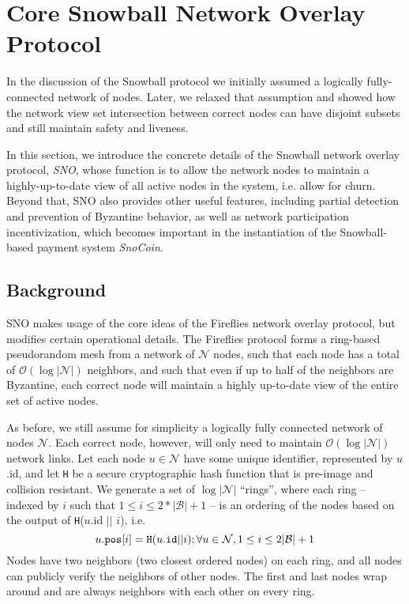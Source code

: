 \section{Core Snowball Network Overlay Protocol}
In the discussion of the Snowball protocol we initially assumed a logically fully-connected network of nodes. 
Later, we relaxed that assumption and showed how the network view set intersection between correct nodes can have disjoint subsets and still maintain safety and liveness. 

In this section, we introduce the concrete details of the Snowball network overlay protocol, \textit{SNO}, whose function is to allow the network nodes to maintain a highly-up-to-date view of all active nodes in the system, i.e. allow for churn.
Beyond that, SNO also provides other useful features, including partial detection and prevention of Byzantine behavior, as well as network participation incentivization, which becomes important in the instantiation of the Snowball-based payment system \textit{SnoCoin}. 

\subsection{Background}
SNO makes usage of the core ideas of the Fireflies\cite{johansen2006fireflies} network overlay protocol, but modifies certain operational details. 
The Fireflies protocol forms a ring-based pseudorandom mesh from a network of $\mathcal{N}$ nodes, such that each node has a total of $\mathcal{O}(\log{|\mathcal{N}|})$ neighbors, and such that even if up to half of the neighbors are Byzantine, each correct node will maintain a highly up-to-date view of the entire set of active nodes. 

As before, we still assume for simplicity a logically fully connected network of nodes $\mathcal{N}$.
Each correct node, however, will only need to maintain $\mathcal{O}(\log{|\mathcal{N}|})$ network links.
Let each node $u \in \mathcal{N}$ have some unique identifier, represented by $u$.id, and let \texttt{H} be a secure cryptographic hash function that is pre-image and collision resistant. 
We generate a set of $\log |\mathcal{N}|$ ``rings'', where each ring -- indexed by $i$ such that $1 \leq i \leq 2*|\mathcal{B}| + 1$ -- is an ordering of the nodes based on the output of \texttt{H}($u$.id $||$ $i$), i.e. 
\[
    u.\text{\texttt{pos}}[i] = \text{\texttt{H}}(u.\text{\texttt{id}} || i); \forall u \in \mathcal{N}, 1 \leq i \leq 2|\mathcal{B}| + 1
\]
Nodes have two neighbors (two closest ordered nodes) on each ring, and all nodes can publicly verify the neighbors of other nodes. The first and last nodes wrap around and are always neighbors with each other on every ring. 

